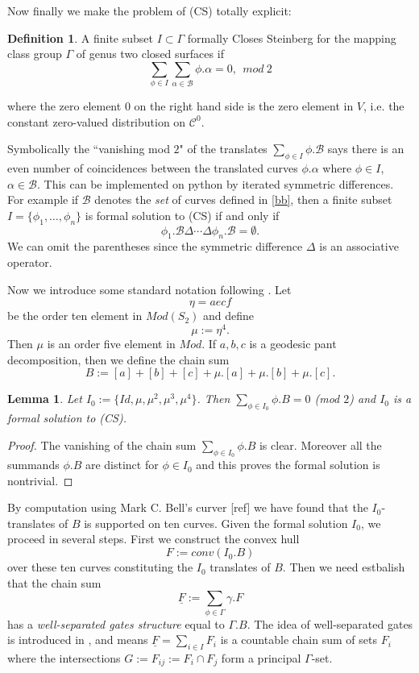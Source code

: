 \documentclass[12pt]{amsart}
\newtheorem{lem}[thm]{Lemma}
\theoremstyle{definition}
\newtheorem{dfn}[thm]{Definition}
\theoremstyle{remark}
\newcommand{\sB}{\mathscr{B}}
\newcommand{\uF}{\underline{F}}
\newcommand{\sC}{\mathscr{C}}
\begin{document}
Now finally we make the problem of (CS) totally explicit: 
\begin{dfn}
A finite subset $I\subset \Gamma$ formally Closes Steinberg for the mapping class group $\Gamma$ of genus two closed surfaces if 
\begin{equation}
\sum_{\phi\in I} \sum_{\alpha\in \sB}\phi.\alpha=0, ~~mod~2
\end{equation}

where the zero element $0$ on the right hand side is the zero element in $V$, i.e. the constant zero-valued distribution on $\sC^0$. 
\end{dfn}

Symbolically the ``vanishing mod $2$" of the translates $\sum_{\phi\in I} \phi.\sB$ says there is an even number of coincidences between the translated curves $\phi.\alpha$ where $\phi\in I$, $\alpha\in \sB$. This can be implemented on python by iterated symmetric differences. For example if $\sB$ denotes the \emph{set} of curves defined in \eqref{bb}, then a finite subset $I=\{\phi_1, \ldots, \phi_n\}$ is formal solution to (CS) if and only if $$\phi_1. \sB \Delta \cdots \Delta \phi_n.\sB = \emptyset.$$ We can omit the parentheses since the symmetric difference $\Delta$ is an associative operator.

Now we introduce some standard notation following \cite{nakamura2018generation}. Let $$\eta=aecf$$ be the order ten element in $Mod(S_2)$ and define $$\mu:=\eta^4.$$ Then $\mu$ is an order five element in $Mod$. If $a,b,c$ is a geodesic pant decomposition, then we define the chain sum $$B:=[a]+[b]+[c]+\mu.[a]+\mu.[b]+\mu.[c].$$

\begin{lem}
Let $I_0:=\{Id, \mu, \mu^2, \mu^3, \mu^4\}$. Then $\sum_{\phi \in I_0} \phi.B=0$ (mod $2$) and $I_0$ is a formal solution to (CS). 
\end{lem}
\begin{proof}
The vanishing of the chain sum $\sum_{\phi \in I_0} \phi.B$ is clear. Moreover all the summands $\phi.B$ are distinct for $\phi \in I_0$ and this proves the formal solution is nontrivial.
\end{proof}

By computation using Mark C. Bell's curver [ref] we have found that the $I_0$-translates of $B$ is supported on ten curves. Given the formal solution $I_0$, we proceed in several steps. First we construct  the convex hull $$F:=conv( I_0.B )$$ over these ten curves constituting the $I_0$ translates of $B$. Then we need estbalish that the chain sum $$\underline{F}:=\sum_{\phi \in \Gamma} \gamma.F$$ has a \emph{well-separated gates structure} equal to $\Gamma.B$. The idea of well-separated gates is introduced in \cite[pp.13, \S 5.1]{martel}, and means $\uF=\sum_{i\in I} F_i$ is a countable chain sum of sets $F_i$ where the intersections $G:=F_{ij}:=F_i\cap F_j$ form a principal $\Gamma$-set.
\end{document}
